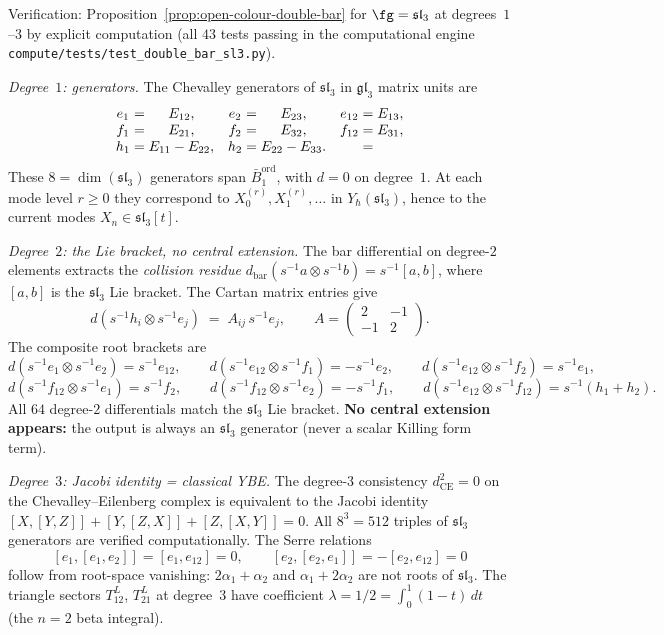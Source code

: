 \begin{computation}%
\label{comp:double-bar-sl3}%
%
Verification: Proposition~\ref{prop:open-colour-double-bar}
for $\fg=\mathfrak{sl}_3$ at degrees~$1$--$3$ by explicit
computation (all $43$ tests passing in the computational
engine
\texttt{compute/tests/test\_double\_bar\_sl3.py}).

\emph{Degree~$1$: generators.}\enspace
The Chevalley generators of $\mathfrak{sl}_3$ in
$\mathfrak{gl}_3$ matrix units are
\[
\begin{array}{c@{\;=\;}cc@{\;=\;}cc@{\;=\;}c}
e_1 & E_{12}, & e_2 & E_{23}, & e_{12} & E_{13}, \\
f_1 & E_{21}, & f_2 & E_{32}, & f_{12} & E_{31}, \\
h_1 & E_{11}-E_{22}, & h_2 & E_{22}-E_{33}. & &
\end{array}
\]
These $8=\dim(\mathfrak{sl}_3)$ generators span
${\bar B}^{\mathrm{ord}}_1$,
with $d=0$ on degree~$1$. At each mode level $r\ge 0$ they
correspond to $X^{(r)}_0,X^{(r)}_1,\ldots$ in
$Y_\hbar(\mathfrak{sl}_3)$, hence to the current modes
$X_{n}\in\mathfrak{sl}_3[t]$.

\emph{Degree~$2$: the Lie bracket, no central extension.}\enspace
The bar differential on degree-$2$ elements extracts the
\emph{collision residue}
$d_{\mathrm{bar}}(s^{-1}a\otimes s^{-1}b)=s^{-1}[a,b]$,
where $[a,b]$ is the $\mathfrak{sl}_3$ Lie bracket. The
Cartan matrix entries give
\[
d(s^{-1}h_i\otimes s^{-1}e_j)
\;=\;
A_{ij}\,s^{-1}e_j,
\qquad
A=\begin{pmatrix}2&-1\\-1&2\end{pmatrix}.
\]
The composite root brackets are
\[
d(s^{-1}e_1\otimes s^{-1}e_2)
=s^{-1}e_{12},
\qquad
d(s^{-1}e_{12}\otimes s^{-1}f_1)
=-s^{-1}e_2,
\qquad
d(s^{-1}e_{12}\otimes s^{-1}f_2)
=s^{-1}e_1,
\]
\[
d(s^{-1}f_{12}\otimes s^{-1}e_1)
=s^{-1}f_2,
\qquad
d(s^{-1}f_{12}\otimes s^{-1}e_2)
=-s^{-1}f_1,
\qquad
d(s^{-1}e_{12}\otimes s^{-1}f_{12})
=s^{-1}(h_1+h_2).
\]
All $64$ degree-$2$ differentials match the
$\mathfrak{sl}_3$ Lie bracket. \textbf{No central extension
appears:} the output is always an $\mathfrak{sl}_3$
generator (never a scalar Killing form term).

\emph{Degree~$3$: Jacobi identity = classical YBE.}\enspace
The degree-$3$ consistency
$d^2_{\mathrm{CE}}=0$ on the Chevalley--Eilenberg complex
is equivalent to the Jacobi identity
$[X,[Y,Z]]+[Y,[Z,X]]+[Z,[X,Y]]=0$.
All $8^3=512$ triples of $\mathfrak{sl}_3$ generators are
verified computationally. The Serre relations
\[
[e_1,[e_1,e_2]]=[e_1,e_{12}]=0,
\qquad
[e_2,[e_2,e_1]]=-[e_2,e_{12}]=0
\]
follow from root-space vanishing:
$2\alpha_1+\alpha_2$ and $\alpha_1+2\alpha_2$ are not
roots of $\mathfrak{sl}_3$. The triangle sectors
$T^L_{12}$, $T^L_{21}$ at degree~$3$ have coefficient
$\lambda=1/2=\int_0^1(1-t)\,dt$ (the $n=2$ beta integral).


\end{computation}
